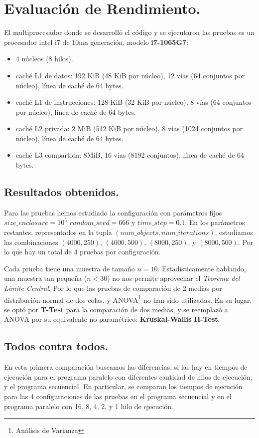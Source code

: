 \documentclass{article}
\begin{document}
\section{Evaluación de Rendimiento.\label{performance}}
El multiprocesador donde se desarrolló el código y se ejecutaron las pruebas es un
procesador intel i7 de 10ma generación, modelo \textbf{i7-1065G7}:
\begin{itemize}
	\item 4 núcleos (8 hilos).
	\item caché L1 de datos: 192 KiB (48 KiB por núcleo), 12 vías (64 conjuntos por núcleo), línea de caché de 64 bytes.
	\item caché L1 de instrucciones: 128 KiB (32 KiB por núcleo), 8 vías (64 conjuntos por núcleo), línea de caché de 64 bytes.
	\item caché L2 privada: 2 MiB (512 KiB por núcleo), 8 vías (1024 conjuntos por núcleo), línea de caché de 64 bytes.
	\item caché L3 compartida: 8MiB, 16 vías (8192 conjuntos), línea de caché de 64 bytes.
\end{itemize}

\subsection{Resultados obtenidos.}
Para las pruebas hemos estudiado la configuración con parámetros fijos ${size\_enclosure}=10^5$ ${random\_seed}=666$ y
${time\_step}=0.1$. En los parámetros restantes, representados en la tupla $({num\_objects}, {num\_iterations})$,
estudiamos las combinaciones $(4000, 250)$, $(4000, 500)$, $(8000, 250)$, y $(8000, 500)$. Por lo que hay
un total de 4 pruebas por configuración.

Cada prueba tiene una muestra de tamaño ${n}=10$. Estadísticamente
hablando, una muestra tan pequeña ($n < 30$) no nos permite aprovechar el \textit{Teorema del Límite Central}.
Por lo que las pruebas de comparación de 2 medias por distribución normal de dos colas, y ANOVA\footnote{Análisis de Varianza}
no han sido utilizadas. En su lugar, se optó por \textbf{T-Test} para la comparación de dos medias, y se reemplazó a ANOVA
por su equivalente no paramétrico: \textbf{Kruskal-Wallis H-Test}.

\subsection{Todos contra todos.\label{kruskal}}
En esta primera comparación buscamos las diferencias, si las hay en tiempos de ejecución para el programa
paralelo con diferentes cantidad de hilos de ejecución, y el programa secuencial. En particular, se comparan
los tiempos de ejecución para las 4 configuraciones de las pruebas en el programa secuencial y en el programa paralelo
con 16, 8, 4, 2, y 1 hilo de ejecución.
\end{document}
